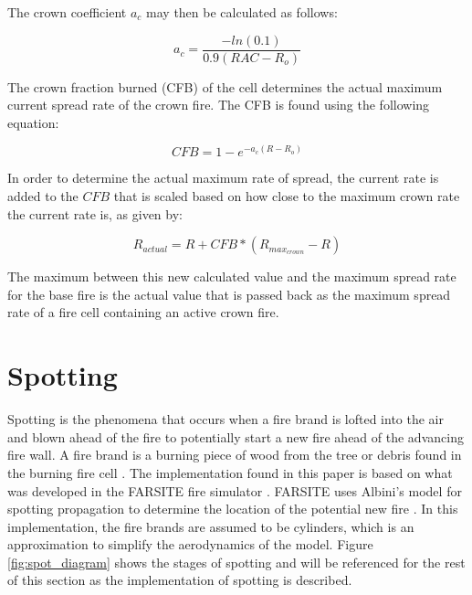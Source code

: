 The crown coefficient $a_c$ may then be calculated as follows:

\begin{equation}
a_c = \frac{-ln(0.1)}{0.9(RAC - R_o)}
\end{equation}

The crown fraction burned (CFB) of the cell determines the actual maximum current spread rate of the crown fire. The CFB is found using the following equation: 

\begin{equation}
CFB = 1 - e^{-a_c(R-R_o)}
\end{equation}

In order to determine the actual maximum rate of spread, the current rate is added to the $CFB$ that is scaled based on how close to the maximum crown rate the current rate is, as given by: 

\begin{equation}
R_{actual} = R + CFB * (R_{max_{crown}} - R)
\end{equation}

The maximum between this new calculated value and the maximum spread rate for the base fire is the actual value that is passed back as the maximum spread rate of a fire cell containing an active crown fire. 

\section{Spotting}
Spotting is the phenomena that occurs when a fire brand is lofted into the air and blown ahead of the fire to potentially start a new fire ahead of the advancing fire wall. A fire brand is a burning piece of wood from the tree or debris found in the burning fire cell \cite{firereview}. The implementation found in this paper is based on what was developed in the FARSITE fire simulator \cite{FARSITE}. FARSITE uses Albini's model for spotting propagation to determine the location of the potential new fire \cite{albini}. In this implementation, the fire brands are assumed to be cylinders, which is an approximation to simplify the aerodynamics of the model. Figure \ref{fig:spot_diagram} shows the stages of spotting and will be referenced for the rest of this section as the implementation of spotting is described. 

